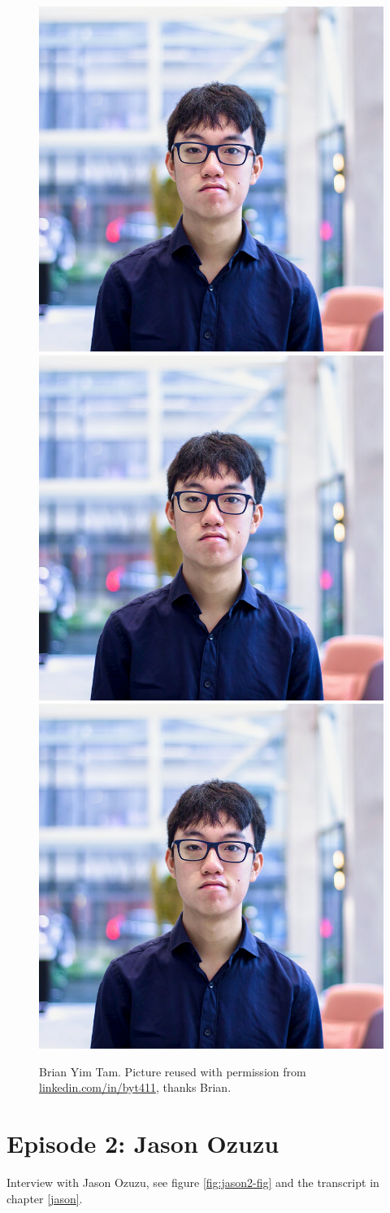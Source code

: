 \documentclass[
]{book}
\begin{document}
\begin{figure}
\includegraphics[width=0.33\linewidth]{images/brian} \includegraphics[width=0.33\linewidth]{images/brian} \includegraphics[width=0.33\linewidth]{images/brian} \caption{Brian Yim Tam. Picture reused with permission from \href{hhttps://www.linkedin.com/in/byt411/}{linkedin.com/in/byt411}, thanks Brian.}\label{fig:brian2-fig}
\end{figure}

\hypertarget{ep2}{%
\section{Episode 2: Jason Ozuzu}\label{ep2}}

Interview with Jason Ozuzu, see figure \ref{fig:jason2-fig} and the transcript in chapter \ref{jason}.
\end{document}
